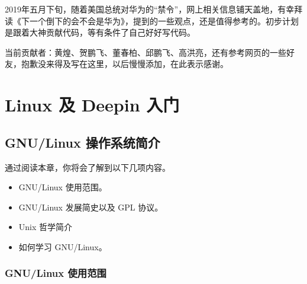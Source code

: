 \documentclass[doctor,openright,twoside]{sjtuthesis}
\newif\ifusepartquote
\newcommand{\thepartquote}{}
\newcommand{\thepartquoteauthor}{}
\newcommand{\partquote}[2]{\ifusepartquote\renewcommand{\thepartquote}{#1}\renewcommand{\thepartquoteauthor}{#2}\fi}
\newif\ifusepartintro
\newcommand{\thepartintro}{}
\newcommand{\partintro}[1]{\ifusepartintro\renewcommand{\thepartintro}{#1}\fi}
\providecommand{\tightlist}{%
    \setlength{\itemsep}{0pt}\setlength{\parskip}{0pt}}
\theoremstyle{plain}
\theoremstyle{definition}
\theoremstyle{remark}
\theoremstyle{ocrenumbox}
\theoremstyle{plain}
\begin{document}
2019年五月下旬，随着美国总统对华为的``禁令''，网上相关信息铺天盖地，有幸拜读《下一个倒下的会不会是华为》，提到的一些观点，还是值得参考的。初步计划是跟着大神贡献代码，等有条件了自己好好写代码。

当前贡献者：黄煌、贺鹏飞、董春柏、邱鹏飞、高洪亮，还有参考网页的一些好友，抱歉没来得及写在这里，以后慢慢添加，在此表示感谢。

\mainmatter
\pagestyle{main}

\partquote{合抱之木，生于毫末；九层之台，起于垒土；千里之行，始于足下。}{老 \quad 子}

\partintro{
\quad\quad “话说天下大势，分久必合，合久必分”。
对于操作系统而言，Linux 有着类似的境地。
GNU/Linux 操作系统发行版众多而杂乱，有些发行版之间相互不兼容对方的软件，安装方法也不尽相同，有点军阀割据的感觉，给初学者带来了不少麻烦。

\quad\quad 但是，万变不离其宗，总有那么一些核心的东西是不变的，有人说这就是 Linux 哲学。
如同“分久必合”能够成功预言一样，那是因为大家骨子里的文化都是一致的，在变化中文化依旧能够保持一致，这样才可以再次“合”。
出于对深度 Deepin 操作系统理念的认同，我深信在某个地方存在着一个极强的凝聚力。我以为就是“敢为天下先”，“天道酬勤”，“愚公移山”，“世上本没有路，走的人多了，大家就都往这里走了。”

\quad\quad 本部分主要介绍 Linux 常识和 Linux 哲学，以及深度操作系统的理念和潜在用户。
}

\hypertarget{part:intro}{%
\part{Linux 及 Deepin 入门}\label{part:intro}}

\hypertarget{chap:linux-intro}{%
\chapter{GNU/Linux 操作系统简介}\label{chap:linux-intro}}

通过阅读本章，你将会了解到以下几项内容。

\begin{itemize}
\tightlist
\item
  GNU/Linux 使用范围。
\item
  GNU/Linux 发展简史以及 GPL 协议。
\item
  Unix 哲学简介
\item
  如何学习 GNU/Linux。
\end{itemize}

\hypertarget{gnulinux-}{%
\section{GNU/Linux 使用范围}\label{gnulinux-}}
\end{document}
